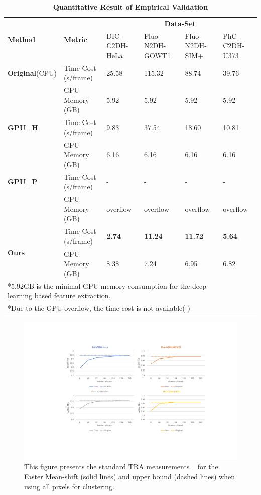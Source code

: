 \documentclass[journal,twoside,web]{ieeecolor}
\begin{document}
\begin{table}[!t]
\caption{\textbf{Quantitative Result of Empirical Validation}}
\setlength{\tabcolsep}{3pt}
\renewcommand\arraystretch{1.3}
\centering
\begin{tabular}{p{3.5cm}<{\centering} | p{3.5cm}<{\centering} | p{2.4cm}<{\centering} p{2.4cm}<{\centering}  p{2.4cm}<{\centering} p{2.4cm}<{\centering} }
\hline
\hline
\multirow{2}{*}{\textbf{Method}} & \multirow{2}{*}{\textbf{Metric}} & \multicolumn{4}{c}{\textbf{Data-Set}}\\
\cline{3-6}
& & DIC-C2DH-HeLa & Fluo-N2DH-GOWT1 & Fluo-N2DH-SIM+ & PhC-C2DH-U373 \\
\hline
\textbf{Original}(CPU) & Time Cost (s/frame) & 25.58 & 115.32 & 88.74 & 39.76  \\
~\cite{b15,b33} & GPU Memory (GB) & 5.92 & 5.92 & 5.92 & 5.92  \\
\hline
\textbf{GPU\_H} & Time Cost (s/frame) &  9.83 &  37.54 &  18.60 & 10.81  \\
~\cite{b19} & GPU Memory (GB) & 6.16 & 6.16 & 6.16 & 6.16  \\
\hline
\textbf{GPU\_P} & Time Cost (s/frame) & - & - & - & -  \\
~\cite{b18} & GPU Memory (GB) &  overflow &  overflow &  overflow &  overflow  \\
\hline
\multirow{2}{*}{\textbf{Ours}} & Time Cost (s/frame) &  \textbf{2.74} & \textbf{11.24} & \textbf{11.72} & \textbf{5.64}  \\
 & GPU Memory (GB) &  8.38 & 7.24 &  6.95 & 6.82  \\
\hline
\hline
\multicolumn{5}{l}{*5.92GB is the minimal GPU memory consumption for the deep learning based feature extraction. }\\
\multicolumn{5}{l}{*Due to the GPU overflow, the time-cost is not available(-)}
\end{tabular}
\label{tab2}
\end{table}


\begin{figure}[t]
\includegraphics[width=6.5 in]{6.pdf}
\centering
\caption{This figure presents the standard TRA measurements ~\cite{b20} for the Faster Mean-shift (solid lines) and upper bound (dashed lines) when using all pixels for clustering.}
\label{fig6}
\end{figure}
\end{document}
